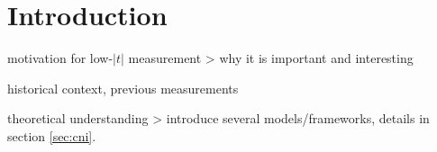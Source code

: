 \section{Introduction}

\> motivation for low-$|t|$ measurement
\>> why it is important and interesting

\> historical context, previous measurements

\> theoretical understanding
\>> introduce several models/frameworks, details in section \ref{sec:cni}.
